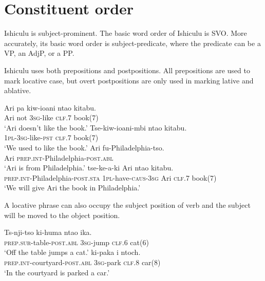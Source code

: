 \chapter{Constituent order}


Ishiculu is subject-prominent. The basic word order of Ishiculu is SVO. More accurately, its basic word order is subject-predicate, where the predicate can be a VP, an AdjP, or a PP.

Ishiculu uses both prepositions and postpositions. All prepositions are used to mark locative case, but overt postpositions are only used in marking lative and ablative.

\begin{exe}
\ex
\gll Ari pa kiw-ioani nta\textbeltl o kitabu. \\
Ari not \textsc{3sg}-like \textsc{clf}.7 book(7) \\
\trans `Ari doesn't like the book.'
\ex
\gll Tse-kiw-ioani-mbi nta\textbeltl o kitabu. \\
\textsc{1pl}-\textsc{3sg}-like-\textsc{pst} \textsc{clf}.7 book(7) \\
\trans `We used to like the book.'
\ex
\gll Ari fu-Philadelphia-tso. \\
Ari \textsc{prep.int}-Philadelphia-\textsc{post.abl} \\
\trans `Ari is from Philadelphia.'
\ex
{} tse-ke-\textbeltl a-ki Ari nta\textbeltl o kitabu. \\
\textsc{prep.int}-Philadelphia-\textsc{post.sta} \textsc{1pl}-have-\textsc{caus}-\textsc{3sg} Ari \textsc{clf}.7 book(7) \\
\trans `We will give Ari the book in Philadelphia.'
\end{exe}

A locative phrase can also occupy the subject position of verb and the subject will be moved to the object position.

\begin{exe}
\ex
\gll Ts\textramshorns-nji-tso ki-huma nta\textbeltl o ika. \\
\textsc{prep.sur}-table-\textsc{post.abl} \textsc{3sg}-jump \textsc{clf}.6 cat(6) \\
\trans `Off the table jumps a cat.'
\ex
{} ki-paka i ntoch\textramshorns. \\
\textsc{prep.int}-courtyard-\textsc{post.abl} \textsc{3sg}-park \textsc{clf}.8 car(8) \\
\trans `In the courtyard is parked a car.'
\end{exe}

